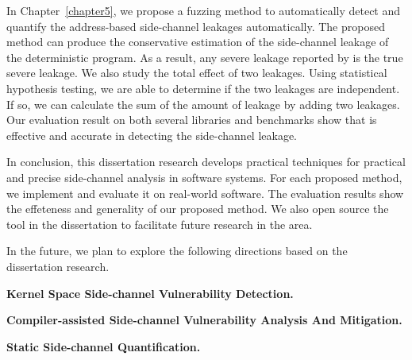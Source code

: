 In Chapter~\ref{chapter5}, we propose a fuzzing method to automatically detect and quantify the address-based side-channel leakages automatically. The proposed method can produce the conservative estimation of the side-channel leakage of the deterministic program. As a result, any severe leakage reported by \ctool{} is the true severe leakage. We also study the total effect of two leakages. Using statistical hypothesis testing, we are able to determine if the two leakages are independent. If so, we can calculate the sum of the amount of leakage by adding two leakages. Our evaluation result on both several libraries and benchmarks show that \ctool{} is effective and accurate in detecting the side-channel leakage.

In conclusion, this dissertation research develops practical techniques for practical and precise side-channel analysis in software systems. For each proposed method, we implement and evaluate it on real-world software. The evaluation results show the effeteness and generality of our proposed method.  We also open source the tool in the dissertation to facilitate future research in the area.

In the future, we plan to explore the following directions based on the dissertation research. 

\textbf{Kernel Space Side-channel Vulnerability Detection.}

\textbf{Compiler-assisted Side-channel Vulnerability Analysis And Mitigation.}

\textbf{Static Side-channel Quantification.}
